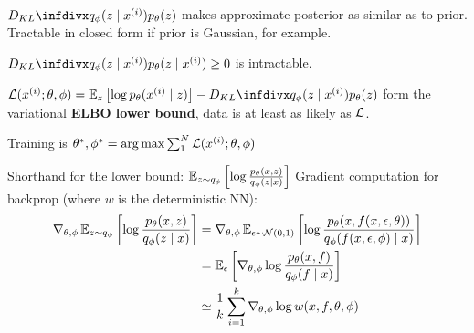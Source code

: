 \documentclass[12pt]{article}
\begin{document}
\item $\dkl{q_{\phi}(z\given x^{(i)})}{p_{\theta}(z)}$ makes approximate posterior as similar as to prior. Tractable in closed form if prior is Gaussian, for example.
\item $\dkl{q_{\phi}(z\given x^{(i)})}{p_{\theta}(z\given x^{(i)})} \geq 0$ is intractable.
\item $\loss (x^{(i)} ; \theta , \phi) = \E_z\left[ \log p_{\theta}(x^{(i)}\given z) \right] - \dkl{q_{\phi}(z\given x^{(i)})}{p_{\theta}(z)}$ form the variational \textbf{ELBO lower bound}, data is at least as likely as $\mathcal{L}$.
\item Training is $\theta^* , \phi^* = \operatorname*{arg\,max} \sum_1^N \mathcal{L} (x^{(i)} ; \theta , \phi)$
\item Shorthand for the lower bound: $\operatorname{\mathbb{E}}_{z\sim q_{\phi}}\left[ \log\frac{p_{\theta}(x,z)}{q_{\phi}(z\mid x)}  \right]$
\ule
Gradient computation for backprop (where $w$ is the deterministic NN):
\begin{equation*}
\begin{split}
\nabla_{\theta , \phi} \operatorname{\mathbb{E}}_{z\sim q_{\phi}} \left[ \log\frac{p_{\theta}(x,z)}{q_{\phi}(z\mid x)} \right] &= \nabla_{\theta , \phi} \operatorname{\mathbb{E}}_{\epsilon\sim\mathcal{N}(0,1)} \left[ \log\frac{p_{\theta}(x,f(x,\epsilon ,\theta))}{q_{\phi}( f(x,\epsilon ,\phi) \mid x)} \right] \\
 & = \operatorname{\mathbb{E}}_{\epsilon} \left[ \nabla_{\theta , \phi}  \log\frac{p_{\theta}(x,f)}{q_{\phi}( f\mid x)} \right] \\
 & \simeq \frac{1}{k} \sum_{i=1}^{k} \nabla_{\theta , \phi} \log w(x,f,\theta ,\phi)
\end{split}
\end{equation*}
\end{document}
